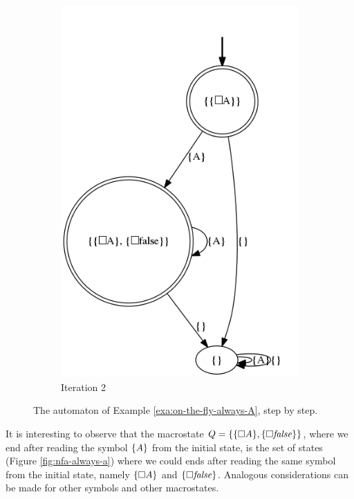 \begin{example}
\begin{figure}[h]
	\begin{subfigure}[b]{0.35\textwidth}
		\includegraphics[width=\textwidth]{images/on-the-fly-always-A-it-complete}
		\caption{Iteration 2}
		\label{fig:exa-on-the-fly-always-A-it-complete}
	\end{subfigure}
	\caption{The automaton of Example \ref{exa:on-the-fly-always-A}, step by step.}\label{fig:exa-on-the-fly-always-A}
\end{figure}

It is interesting to observe that the macrostate $Q = \{\{\Box A\}, \{\Box \mathit{false}\}\}$, where we end after reading the symbol $\{A\}$ from the initial state, is the set of \NFA states (Figure \ref{fig:nfa-always-a}) where we could ends after reading the same symbol from the initial state, namely $\{\Box A\}$ and $\{\Box \mathit{false}\}$. Analogous considerations can be made for other symbols and other macrostates.


\end{example}
